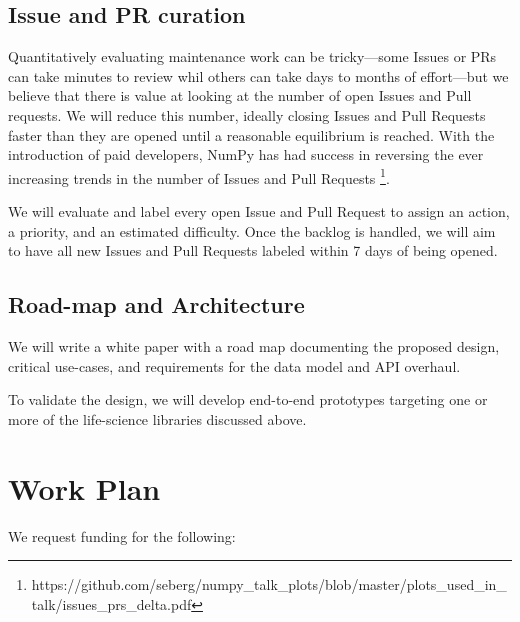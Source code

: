 \documentclass[11pt]{article}  %
\begin{document}
\subsection{Issue and PR curation}

Quantitatively evaluating maintenance work can be tricky---some Issues
or PRs can take minutes to review whil others can take days to
months of effort---but we believe that there is value at looking at
the number of open Issues and Pull requests.  We will reduce this
number, ideally closing Issues and Pull Requests faster than they are
opened until a reasonable equilibrium is reached.
With the introduction of paid developers,
NumPy has had success in reversing the ever increasing trends
in the number of Issues and Pull Requests
\footnote{https://github.com/seberg/numpy\_talk\_plots/blob/master/plots\_used\_in\_talk/issues\_prs\_delta.pdf}.


We will evaluate and label every open Issue and Pull Request to
assign an action, a priority, and an estimated
difficulty.  Once the backlog is handled, we will aim to have all new Issues and
Pull Requests labeled within 7 days of being opened.


\subsection{Road-map and Architecture}

We will write a white paper with a road map documenting the proposed
design, critical use-cases, and requirements for the data model and
API overhaul.

To validate the design, we will develop end-to-end prototypes
targeting one or more of the life-science libraries discussed above.


\section{Work Plan}

We request funding for the following:
\end{document}
